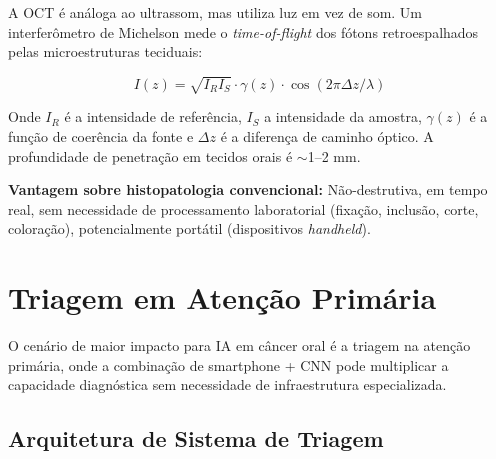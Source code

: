 A OCT é análoga ao ultrassom, mas utiliza luz em vez de som. Um interferômetro
de Michelson mede o \textit{time-of-flight} dos fótons retroespalhados pelas
microestruturas teciduais:

\begin{equation}
  I(z) = \sqrt{I_R I_S} \cdot \gamma(z) \cdot \cos(2\pi \Delta z / \lambda)
  \label{eq:oct}
\end{equation}

Onde $I_R$ é a intensidade de referência, $I_S$ a intensidade da amostra,
$\gamma(z)$ é a função de coerência da fonte e $\Delta z$ é a diferença de
caminho óptico. A profundidade de penetração em tecidos orais é $\sim$1--2 mm.

\textbf{Vantagem sobre histopatologia convencional:} Não-destrutiva, em tempo
real, sem necessidade de processamento laboratorial (fixação, inclusão, corte,
coloração), potencialmente portátil (dispositivos \textit{handheld}).

\section{Triagem em Atenção Primária}
\label{sec:triagem-atencao-primaria}

O cenário de maior impacto para IA em câncer oral é a triagem na atenção primária,
onde a combinação de smartphone + CNN pode multiplicar a capacidade diagnóstica
sem necessidade de infraestrutura especializada.

\subsection{Arquitetura de Sistema de Triagem}

